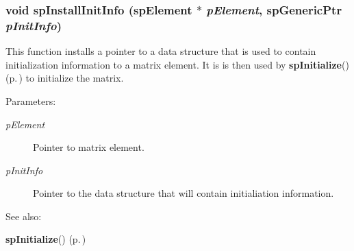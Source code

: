 \subsubsection{\setlength{\rightskip}{0pt plus 5cm}void sp\-Install\-Init\-Info ({\bf sp\-Element} $\ast$ {\em p\-Element}, sp\-Generic\-Ptr {\em p\-Init\-Info})}\label{spBuild_8c_a22}


This function installs a pointer to a data structure that is used to contain initialization information to a matrix element. It is is then used by {\bf sp\-Initialize}() {\rm (p.\,\pageref{spBuild_8c_a21})} to initialize the matrix.\begin{Desc}
\item[Parameters: ]\par
\begin{description}
\item[{\em 
p\-Element}]Pointer to matrix element. \item[{\em 
p\-Init\-Info}]Pointer to the data structure that will contain initialiation information. \end{description}
\end{Desc}
\begin{Desc}
\item[See also: ]\par
{\bf sp\-Initialize}() {\rm (p.\,\pageref{spBuild_8c_a21})} \end{Desc}
